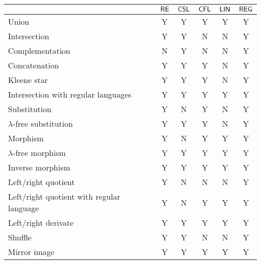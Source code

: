 \begin{center}
\begin{tabular}{ | l | c | c | c | c | c | }
\hline
              & $\textup{\sf RE}$
              & $\textup{\sf CSL}$
              & $\textup{\sf CFL}$
              & $\textup{\sf LIN}$
              & $\textup{\sf REG}$\\
\hline
\index{union}Union
              & Y     & Y      & Y      & Y      & Y \\
\hline
\index{intersection}Intersection
              & Y     & Y      & N      & N      & Y \\
\hline
\index{complementation}Complementation
              & N     & Y      & N      & N      & Y \\
\hline
\index{concatenation}Concatenation
              & Y     & Y      & Y      & N      & Y \\
\hline
\index{Kleene star}Kleene star
              & Y     & Y      & Y      & N      & Y \\
\hline
\index{intersection!with regular language}Intersection with regular languages
              & Y     & Y      & Y      & Y      & Y \\
\hline
\index{substitution}Substitution
              & Y     & N      & Y      & N      & Y \\
\hline
\index{substitution!$\lambda$-free}$\lambda$-free substitution
              & Y     & Y      & Y      & N      & Y \\
\hline
\index{morphism}Morphism
              & Y     & N      & Y      & Y      & Y \\
\hline
\index{morphism!$\lambda$-free}$\lambda$-free morphism
              & Y     & Y      & Y      & Y      & Y \\
\hline
\index{morphism!inverse}Inverse morphism
              & Y     & Y      & Y      & Y      & Y \\
\hline
\index{left-quotient}\index{right-quotient}Left/right quotient
              & Y     & N      & N      & N      & Y \\
\hline
\index{left-quotient!with regular language}\index{right-quotient!with regular
language}Left/right quotient with regular language
              & Y     & N      & Y      & Y      & Y \\
\hline
\index{left-derivate}\index{right-derivate}Left/right derivate
              & Y     & Y      & Y      & Y      & Y \\
\hline
\index{shuffle}Shuffle
              & Y     & Y      & N      & N      & Y \\
\hline
\index{mirror image}Mirror image
              & Y     & Y      & Y      & Y      & Y \\
\hline
\end{tabular}
\end{center}

